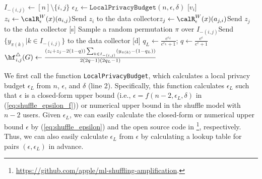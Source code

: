 \setlength{\algomargin}{5mm}
\begin{algorithm}[t]
  \SetAlgoLined
  $I_{-(i,j)} \leftarrow [n]\setminus\{i,j\}$\;
  $\epsilon_L \leftarrow \texttt{LocalPrivacyBudget}(n,\epsilon,\delta)$\;
  [$v_i$] $z_i \leftarrow \calR_{\epsilon}^W(x)(a_{i,j})$\;
  [$v_i$] Send $z_i$ to the data collector\;
  [$v_j$] $z_j \leftarrow \calR_{\epsilon}^W(x)(a_{j,i})$\;
  [$v_j$] Send $z_j$ to the data collector\;
  [s] Sample a random permutation $\pi$ over $I_{-(i,j)}$\;
  [s] Send $\{y_{\pi(k)} | k \in I_{-(i,j)}\}$ to the data collector\;
  [d] $q_L \leftarrow \frac{e^{\epsilon_L}}{e^{\epsilon_L}+1}$; $q \leftarrow \frac{e^\epsilon}{e^\epsilon+1}$\;
  [d] $\hf_{i,j}^\triangle(G) \leftarrow \frac{(z_i+z_j-2(1-q))\sum_{k \in I_{-(i,j)}} (y_{\pi(k)} - (1-q_L))}{2(2q-1)(2q_L-1)}$\;
  \caption{\AlgWSLE{} 
  (Wedge Shuffling with Local Edges). 
  [$v_i$], [s], and [d] represent that the process is run by user $v_i$, the shuffler, and the data collector, respectively. 
  }\label{alg:WSLE}
\end{algorithm}

We first call the function \texttt{LocalPrivacyBudget}, which calculates a local privacy budget $\epsilon_L$ from $n$, $\epsilon$, and $\delta$ (line 2). 
Specifically, this function calculates $\epsilon_L$ 
such that $\epsilon$ is a closed-form upper bound (i.e., $\epsilon = f(n-2, \epsilon_L, \delta)$ in (\ref{eq:shuffle_epsilon_f})) or numerical upper bound in the shuffle model with $n-2$ users. 
Given $\epsilon_L$, we can easily calculate the closed-form or numerical upper bound $\epsilon$ by (\ref{eq:shuffle_epsilon}) and the open source code in \cite{Feldman_FOCS21}\footnote{\url{https://github.com/apple/ml-shuffling-amplification}.}, respectively. 
Thus, we can also easily calculate $\epsilon_L$ from $\epsilon$ by calculating a lookup table for pairs $(\epsilon, \epsilon_L)$ in advance. 

